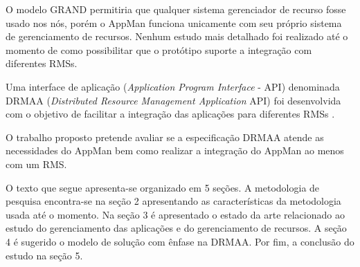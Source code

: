 O modelo GRAND permitiria que qualquer sistema gerenciador de recurso fosse usado nos nós, porém o AppMan funciona unicamente com seu próprio sistema de gerenciamento de recursos. Nenhum estudo mais detalhado foi realizado até o momento de como possibilitar que o protótipo suporte a integração com diferentes RMSs.

Uma interface de aplicação (\emph{Application Program Interface} - API) denominada DRMAA (\emph{Distributed Resource Management Application} API) foi desenvolvida com o objetivo de facilitar a integração das aplicações para diferentes RMSs \cite{Rajic2004}.

O trabalho proposto pretende avaliar se a especificação DRMAA atende as necessidades do AppMan bem como realizar a integração do AppMan ao menos com um RMS.

O texto que segue apresenta-se organizado em 5 seções. A metodologia de pesquisa encontra-se na seção 2 apresentando as características da metodologia usada até o momento. Na seção 3 é apresentado o estado da arte relacionado ao estudo do gerenciamento das aplicações e do gerenciamento de recursos. A seção 4 é sugerido o modelo de solução com ênfase na DRMAA. Por fim, a conclusão do estudo na seção 5.
